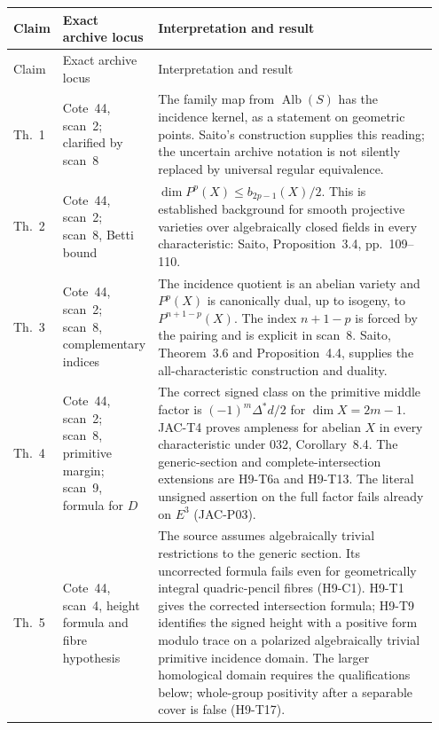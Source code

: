 \begingroup
\small
\setlength{\tabcolsep}{4pt}
\renewcommand{\arraystretch}{1.15}
\begin{longtable}{@{}p{0.08\linewidth}p{0.19\linewidth}p{0.68\linewidth}@{}}
\toprule
Claim & Exact archive locus & Interpretation and result\\
\midrule
\endfirsthead
\toprule
Claim & Exact archive locus & Interpretation and result\\
\midrule
\endhead
Th.~1 & Cote~44, scan~2; clarified by scan~8 &
The family map from $\operatorname{Alb}(S)$ has the incidence
kernel, as a statement on geometric points. Saito's construction
supplies this reading; the uncertain archive notation is not
silently replaced by universal regular equivalence.\\

Th.~2 & Cote~44, scan~2; scan~8, Betti bound &
$\dim P^p(X)\le b_{2p-1}(X)/2$. This is established background for
smooth projective varieties over algebraically closed fields in
every characteristic: Saito, Proposition~3.4, pp.~109--110.\\

Th.~3 & Cote~44, scan~2; scan~8, complementary indices &
The incidence quotient is an abelian variety and $P^p(X)$ is
canonically dual, up to isogeny, to $P^{n+1-p}(X)$.
The index $n+1-p$ is forced by the pairing and is explicit in
scan~8. Saito, Theorem~3.6 and Proposition~4.4, supplies the
all-characteristic construction and duality.\\

Th.~4 & Cote~44, scan~2; scan~8, primitive margin; scan~9, formula for $D$ &
The correct signed class on the primitive middle factor is
$(-1)^m\Delta^*d/2$ for $\dim X=2m-1$.
JAC-T4 proves ampleness for abelian $X$ in every characteristic
under 032, Corollary~8.4. The generic-section and complete-intersection
extensions are H9-T6a and H9-T13. The literal unsigned assertion
on the full factor fails already on $E^3$ (JAC-P03).\\

Th.~5 & Cote~44, scan~4, height formula and fibre hypothesis &
The source assumes algebraically trivial restrictions to the generic
section. Its uncorrected formula fails even for geometrically
integral quadric-pencil fibres (H9-C1). H9-T1 gives the corrected
intersection formula; H9-T9 identifies the signed height with a
positive form modulo trace on a polarized algebraically trivial
primitive incidence domain. The larger homological domain requires
the qualifications below; whole-group positivity after a separable
cover is false (H9-T17).\\


\end{longtable}
